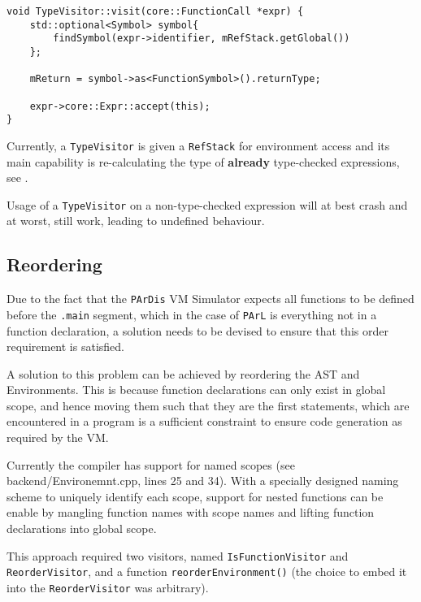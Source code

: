 \begin{lstlisting}[caption={The \texttt{visit(FunctionCall *)}
method in the \texttt{TypeVisitor} class
(ir\_gen/TypeVisitor.cpp)}, label=lst:recomputefunctype]
void TypeVisitor::visit(core::FunctionCall *expr) {
    std::optional<Symbol> symbol{
        findSymbol(expr->identifier, mRefStack.getGlobal())
    };

    mReturn = symbol->as<FunctionSymbol>().returnType;

    expr->core::Expr::accept(this);
}
\end{lstlisting}

Currently, a \texttt{TypeVisitor} is given a \texttt{RefStack}
for environment access and its main capability is re-calculating
the type of \textbf{already} type-checked expressions, see
.

\begin{marker}
Usage of a \texttt{TypeVisitor} on a non-type-checked expression
will at best crash and at worst, still work, leading to
undefined behaviour.
\end{marker}

\subsection{Reordering}\label{sss:reordersec}

Due to the fact that the \texttt{PArDis} VM Simulator expects
all functions to be defined before the \texttt{.main} segment,
which in the case of \texttt{PArL} is everything not in a
function declaration, a solution needs to be devised to ensure
that this order requirement is satisfied.

A solution to this problem can be achieved by reordering the AST
and Environments. This is because function declarations can only
exist in global scope, and hence moving them such that they are
the first statements, which are encountered in a program is a
sufficient constraint to ensure code generation as required by
the VM.

\begin{todo}
Currently the compiler has support for named scopes (see
backend/Environemnt.cpp, lines 25 and 34). With a specially
designed naming scheme to uniquely identify each scope, support
for nested functions can be enable by mangling function names
with scope names and lifting function declarations into global
scope.
\end{todo}

This approach required two visitors, named
\texttt{IsFunctionVisitor} and \texttt{ReorderVisitor}, and a
function \texttt{reorderEnvironment()} (the choice to embed it
into the \texttt{ReorderVisitor} was arbitrary).

